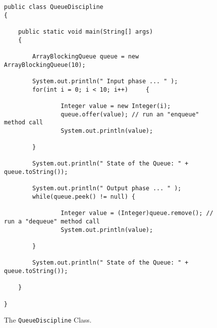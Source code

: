 \documentclass[12pt]{article}
\begin{document}
\begin{enumerate}
\begin{figure}[t]
{\begin{verbatim}
public class QueueDiscipline
{

    public static void main(String[] args)
    {

        ArrayBlockingQueue queue = new ArrayBlockingQueue(10);

        System.out.println(" Input phase ... " );
        for(int i = 0; i < 10; i++)	    {

                Integer value = new Integer(i);
                queue.offer(value); // run an "enqueue" method call
                System.out.println(value);

        }

        System.out.println(" State of the Queue: " + queue.toString());

        System.out.println(" Output phase ... " );
        while(queue.peek() != null) {

                Integer value = (Integer)queue.remove(); // run a "dequeue" method call
                System.out.println(value);

        }

        System.out.println(" State of the Queue: " + queue.toString());

    }

}
\end{verbatim}
}

\caption{The {\tt QueueDiscipline} Class.}
\label{Queue}
\end{figure}






\end{enumerate}
\end{document}
